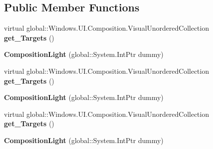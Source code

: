 \subsection*{Public Member Functions}
\begin{DoxyCompactItemize}
\item 
\mbox{\label{class_windows_1_1_u_i_1_1_composition_1_1_composition_light_a93b7a417f075085ffa35bf1cc7425e81}} 
virtual global\+::\+Windows.\+U\+I.\+Composition.\+Visual\+Unordered\+Collection {\bfseries get\+\_\+\+Targets} ()
\item 
\mbox{\label{class_windows_1_1_u_i_1_1_composition_1_1_composition_light_a7cbe3c2b1c2016f76203e9cd55b6e13f}} 
{\bfseries Composition\+Light} (global\+::\+System.\+Int\+Ptr dummy)
\item 
\mbox{\label{class_windows_1_1_u_i_1_1_composition_1_1_composition_light_a93b7a417f075085ffa35bf1cc7425e81}} 
virtual global\+::\+Windows.\+U\+I.\+Composition.\+Visual\+Unordered\+Collection {\bfseries get\+\_\+\+Targets} ()
\item 
\mbox{\label{class_windows_1_1_u_i_1_1_composition_1_1_composition_light_a7cbe3c2b1c2016f76203e9cd55b6e13f}} 
{\bfseries Composition\+Light} (global\+::\+System.\+Int\+Ptr dummy)
\item 
\mbox{\label{class_windows_1_1_u_i_1_1_composition_1_1_composition_light_a93b7a417f075085ffa35bf1cc7425e81}} 
virtual global\+::\+Windows.\+U\+I.\+Composition.\+Visual\+Unordered\+Collection {\bfseries get\+\_\+\+Targets} ()
\item 
\mbox{\label{class_windows_1_1_u_i_1_1_composition_1_1_composition_light_a7cbe3c2b1c2016f76203e9cd55b6e13f}} 
{\bfseries Composition\+Light} (global\+::\+System.\+Int\+Ptr dummy)
\item 
\mbox{\label{class_windows_1_1_u_i_1_1_composition_1_1_composition_light_a93b7a417f075085ffa35bf1cc7425e81}} 

\end{DoxyCompactItemize}
